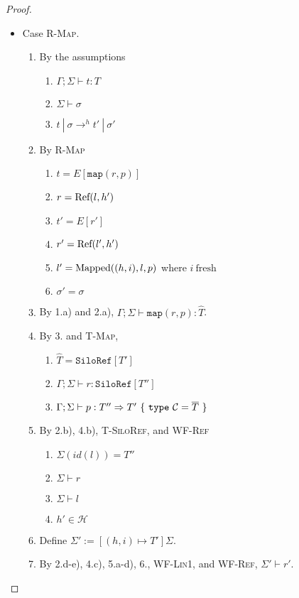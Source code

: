 \begin{proof}
\begin{itemize}
\item Case \textsc{R-Map}.
\begin{enumerate}
\item By the assumptions
  \begin{enumerate}[label=(\alph*)]
  \item $\Gamma ; \Sigma \vdash t : T$
  \item $\Sigma \vdash \sigma$
  \item $t~|~\sigma \rightarrow^h t'~|~\sigma'$
  \end{enumerate}
\item By \textsc{R-Map}
  \begin{enumerate}[label=(\alph*)]
  \item $t  = E[\texttt{map}(r, p)]$
  \item $r  = {\textrm{Ref}(l, h')}$
  \item $t' = E[r']$
  \item $r' = {\textrm{Ref}(l', h')}$
  \item $l' = {\textrm{Mapped}((h, i), l, p)}$ where $i~\text{fresh}$
  \item $\sigma' = \sigma$
  \end{enumerate}
\item By 1.a) and 2.a), $\Gamma ; \Sigma \vdash \texttt{map}(r, p) : \hat{T}$.
\item By 3. and \textsc{T-Map},
  \begin{enumerate}[label=(\alph*)]
  \item $\hat{T} = \texttt{SiloRef}[T']$
  \item $\Gamma ; \Sigma \vdash r : \texttt{SiloRef}[T'']$
  \item $\Gamma ; \Sigma \vdash p : T'' \Rightarrow T'~\{~\texttt{type}~\mathcal{C} = \overline{T}~\}$
  \end{enumerate}
\item By 2.b), 4.b), \textsc{T-SiloRef}, and \textsc{WF-Ref}
  \begin{enumerate}[label=(\alph*)]
  \item $\Sigma(id(l)) = T''$
  \item $\Sigma \vdash r$
  \item $\Sigma \vdash l$
  \item $h' \in \mathcal{H}$
  \end{enumerate}
\item Define $\Sigma' := [(h, i) \mapsto T']\Sigma$.
\item By 2.d-e), 4.c), 5.a-d), 6., \textsc{WF-Lin1}, and \textsc{WF-Ref}, $\Sigma' \vdash r'$.

\end{enumerate}
\end{itemize}
\end{proof}
